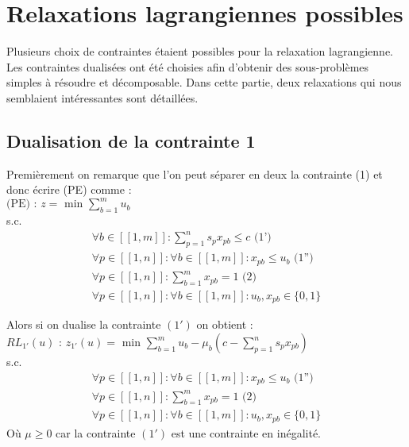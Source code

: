 \documentclass{article}
\begin{document}
\section{Relaxations lagrangiennes possibles}

Plusieurs choix de contraintes étaient possibles pour la relaxation lagrangienne.
Les contraintes dualisées ont été choisies afin d'obtenir des sous-problèmes simples à résoudre et décomposable.
Dans cette partie, deux relaxations qui nous semblaient intéressantes sont détaillées.

\subsection{Dualisation de la contrainte 1}

Premièrement on remarque que l'on peut séparer en deux la contrainte (1) et donc écrire (PE) comme : \\

$\text{(PE) : } z = \text{ min } \sum \limits_{b = 1 }^{m} u_b$\\
s.c.
\begin{align*}
 \forall b \in [\![ 1 , m ]\!] : \sum \limits_{p = 1}^{n} s_p x_{pb} \leqslant c \text{ (1')}\\
 \forall p \in [\![ 1 , n ]\!] : \forall b \in [\![ 1 , m ]\!] : x_{pb} \leqslant u_b \text{ (1'')}\\
 \forall p \in [\![ 1 , n ]\!] : \sum \limits_{b = 1}^{m} x_{pb} = 1 \text{ (2)}\\
 \forall p \in [\![ 1 , n ]\!] : \forall b \in [\![ 1 , m ]\!] : u_b , x_{pb} \in \{0,1\}
\end{align*}

Alors si on dualise la contrainte $(1')$ on obtient :\\
$RL_{1'}(u) \text{ : } z_{1'}(u) = \text{ min } \sum \limits_{b = 1}^{m} u_b - \mu_b (c - \sum \limits_{p = 1}^{n} s_p x_{pb} )$\\
s.c.
\begin{align*}
 \forall p \in [\![ 1 , n ]\!] : \forall b \in [\![ 1 , m ]\!] : x_{pb} \leqslant u_b \text{ (1'')}\\
 \forall p \in [\![ 1 , n ]\!] : \sum \limits_{b = 1}^{m} x_{pb} = 1 \text{ (2)}\\
 \forall p \in [\![ 1 , n ]\!] : \forall b \in [\![ 1 , m ]\!] : u_b , x_{pb} \in \{0,1\}
\end{align*}
Où $\mu \geqslant 0$ car la contrainte $(1')$ est une contrainte en inégalité.\\
\end{document}
